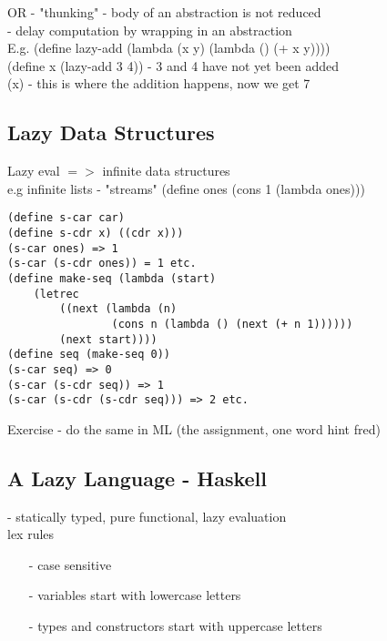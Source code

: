 \documentclass[11pt]{article}
\begin{document}
OR - "thunking" - body of an abstraction is not reduced \\

- delay computation by wrapping in an abstraction \\

E.g. (define lazy-add (lambda (x y) (lambda () (+ x y)))) \\

(define x (lazy-add 3 4)) - 3 and 4 have not yet been added \\

(x) - this is where the addition happens, now we get 7 \\

\subsection{Lazy Data Structures}

Lazy eval $=>$ infinite data structures \\

e.g infinite lists - "streams" (define ones (cons 1 (lambda ones))) \\

\begin{verbatim}
(define s-car car)
(define s-cdr x) ((cdr x)))
(s-car ones) => 1
(s-car (s-cdr ones)) = 1 etc.
(define make-seq (lambda (start)
	(letrec
		((next (lambda (n)
				(cons n (lambda () (next (+ n 1))))))
		(next start))))
(define seq (make-seq 0))
(s-car seq) => 0
(s-car (s-cdr seq)) => 1
(s-car (s-cdr (s-cdr seq))) => 2 etc.
\end{verbatim}

Exercise - do the same in ML (the assignment, one word hint fred) \\

\subsection{A Lazy Language - Haskell}

- statically typed, pure functional, lazy evaluation \\

lex rules 
\begin{itemize}
	\item[-] case sensitive
	\item[-] variables start with lowercase letters
	\item[-] types and constructors start with uppercase letters
\end{itemize}
\end{document}
